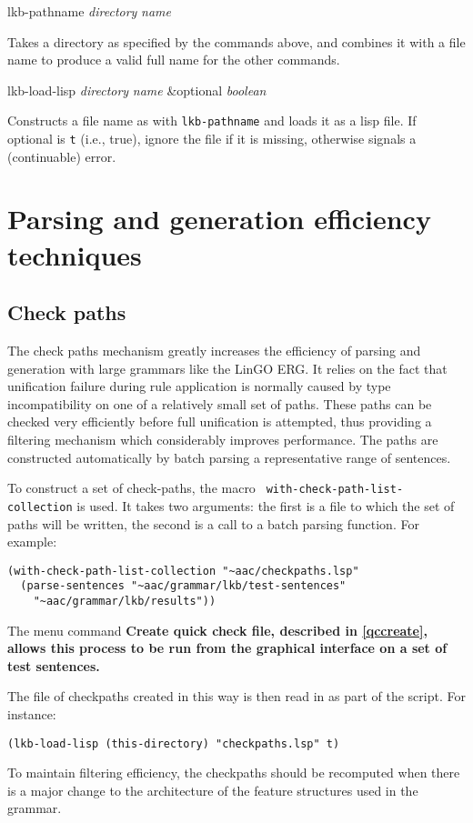 \documentclass[12pt]{report}
\newcommand{\lispcommand}[1]{\noindent\rm #1}%
\newcommand{\functionname}[1]{{\tt #1}}
\newcommand{\lkbmenucommand}{\bf}
\begin{document}
\lispcommand{lkb-pathname {\it directory} {\it name}}

Takes a directory as specified by the commands above, and combines it
with a file name to produce a valid full name for the other commands.

\lispcommand{lkb-load-lisp {\it directory} {\it name} 
\&optional {\it boolean}}

Constructs a file name as with \functionname{lkb-pathname} and loads it
as a lisp file.  If optional is {\tt t} (i.e., true),
ignore the file if it is missing, otherwise signals a (continuable) error.

\section{Parsing and generation efficiency techniques}

\subsection{Check paths}
\label{checkpaths}

The check paths mechanism greatly increases the efficiency of
parsing and generation with large grammars like the LinGO ERG.
It relies on the fact that unification failure during rule application
is normally caused by type incompatibility on one of a relatively
small set of paths.  These paths can be checked very efficiently 
before full unification is attempted, thus providing a filtering
mechanism which considerably improves performance.  The paths
are constructed automatically by batch parsing a representative
range of sentences.

To construct a set of check-paths, the macro {\tt
with-check-path-list-collection} is used.  It takes two arguments: the first is
a file to which the set of paths will be written, the second
is a call to a batch parsing function.  For example:
\begin{verbatim}
(with-check-path-list-collection "~aac/checkpaths.lsp"
  (parse-sentences "~aac/grammar/lkb/test-sentences" 
    "~aac/grammar/lkb/results"))
\end{verbatim}
The menu command \lkbmenucommand{Create quick check file},
described in \ref{qccreate}, allows this process to be
run from the graphical interface on a set of test sentences.

The file of checkpaths created in this way
is then read in as part of the script.
For instance:
\begin{verbatim}
(lkb-load-lisp (this-directory) "checkpaths.lsp" t)
\end{verbatim}
To maintain filtering efficiency, the checkpaths should be
recomputed when there is a major change to the 
architecture of the feature structures used in the grammar.
\end{document}
